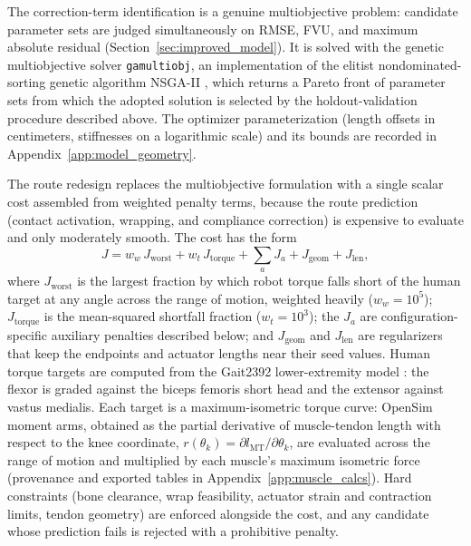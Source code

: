 The correction-term identification is a genuine multiobjective problem: candidate parameter sets are judged simultaneously on RMSE, FVU, and maximum absolute residual (Section~\ref{sec:improved_model}). It is solved with the genetic multiobjective solver \texttt{gamultiobj}, an implementation of the elitist nondominated-sorting genetic algorithm NSGA-II \citep{deb_nsga2_2002, mathworks_optimization_2025}, which returns a Pareto front of parameter sets from which the adopted solution is selected by the holdout-validation procedure described above. The optimizer parameterization (length offsets in centimeters, stiffnesses on a logarithmic scale) and its bounds are recorded in Appendix~\ref{app:model_geometry}.

The route redesign replaces the multiobjective formulation with a single scalar cost assembled from weighted penalty terms, because the route prediction (contact activation, wrapping, and compliance correction) is expensive to evaluate and only moderately smooth. The cost has the form
\begin{equation}
    J = w_{w}\,J_{\text{worst}} + w_{t}\,J_{\text{torque}} + \textstyle\sum_{a} J_{a} + J_{\text{geom}} + J_{\text{len}},
    \label{eq:opt_cost}
\end{equation}
where $J_{\text{worst}}$ is the largest fraction by which robot torque falls short of the human target at any angle across the range of motion, weighted heavily ($w_{w} = 10^{5}$); $J_{\text{torque}}$ is the mean-squared shortfall fraction ($w_{t} = 10^{3}$); the $J_{a}$ are configuration-specific auxiliary penalties described below; and $J_{\text{geom}}$ and $J_{\text{len}}$ are regularizers that keep the endpoints and actuator lengths near their seed values. Human torque targets are computed from the Gait2392 lower-extremity model \citep{delp_opensim_2007, seth_opensim_2018}: the flexor is graded against the biceps femoris short head and the extensor against vastus medialis. Each target is a maximum-isometric torque curve: OpenSim moment arms, obtained as the partial derivative of muscle-tendon length with respect to the knee coordinate, $r(\theta_{k}) = \partial l_{\mathrm{MT}}/\partial\theta_{k}$, are evaluated across the range of motion and multiplied by each muscle's maximum isometric force (provenance and exported tables in Appendix~\ref{app:muscle_calcs}). Hard constraints (bone clearance, wrap feasibility, actuator strain and contraction limits, tendon geometry) are enforced alongside the cost, and any candidate whose prediction fails is rejected with a prohibitive penalty.


